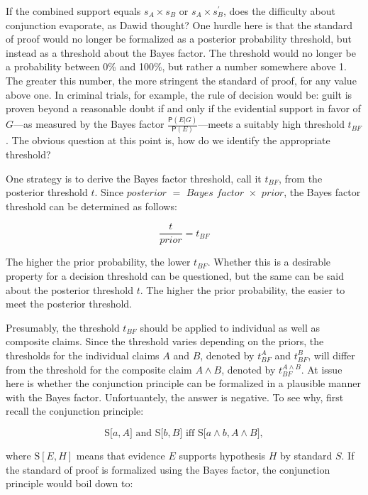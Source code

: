 \documentclass[10pt,dvipsnames,enabledeprecatedfontcommands]{scrartcl}
\newcommand{\pr}[1]{\mathsf{P}(#1)}
\begin{document}
If the combined support equals \(s_{A}\times s_{B}\) or
\(s_{A}\times s^{'}_{B}\), does the difficulty about conjunction
evaporate, as Dawid thought? One hurdle here is that the standard of
proof would no longer be formalized as a posterior probability
threshold, but instead as a threshold about the Bayes factor. The
threshold would no longer be a probability between 0\% and 100\%, but
rather a number somewhere above 1. The greater this number, the more
stringent the standard of proof, for any value above one. In criminal
trials, for example, the rule of decision would be: guilt is proven
beyond a reasonable doubt if and only if the evidential support in favor
of \(G\)---as measured by the Bayes factor
\(\frac{\pr{E | G}}{\pr{E}}\)---meets a suitably high threshold
\(t_{BF}\). The obvious question at this point is, how do we identify
the appropriate
threshold?

One strategy is to derive the Bayes factor threshold, call it
\(t_{BF}\), from the posterior threshold \(t\). Since
\(\textit{posterior }=\textit{ Bayes factor }\times \textit{ prior}\),
the Bayes factor threshold can be determined as follows:

\[\frac{t}{\textit{prior}}=t_{BF}\]

\noindent The higher the prior probability, the lower \(t_{BF}\).
Whether this is a desirable property for a decision threshold can be
questioned, but the same can be said about the posterior threshold
\(t\). The higher the prior probability, the easier to meet the
posterior threshold.

Presumably, the threshold \(t_{BF}\) should be applied to individual as
well as composite claims. Since the threshold varies depending on the
priors, the thresholds for the individual claims \(A\) and \(B\),
denoted by \(t_{BF}^A\) and \(t_{BF}^B\), will differ from the threshold
for the composite claim \(A \wedge B\), denoted by
\(t_{BF}^{A\wedge B}\). At issue here is whether the conjunction
principle can be formalized in a plausible manner with the Bayes factor.
Unfortuantely, the answer is negative. To see why, first recall the
conjunction principle:

\[\text{S[$a, A$] and S[$b, B$] iff S[$a \wedge b, A\wedge B$]},\]

\noindent where \(\text{S}[E, H]\) means that evidence \(E\) supports
hypothesis \(H\) by standard \(S\). If the standard of proof is
formalized using the Bayes factor, the conjunction principle would boil
down to:
\end{document}
